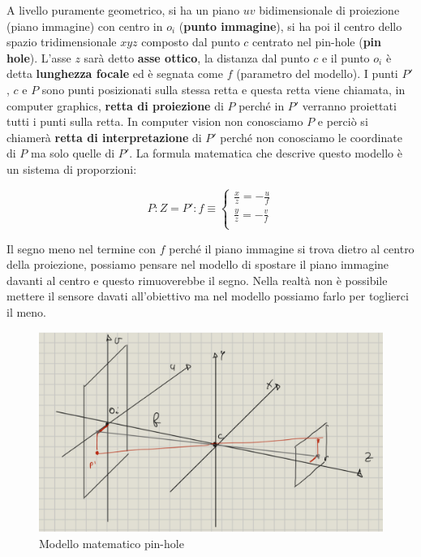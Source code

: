 A livello puramente geometrico, si ha un piano $uv$ bidimensionale di proiezione (piano immagine)
con centro in $o_i$ (\textbf{punto immagine}), si ha poi il centro dello spazio tridimensionale $xyz$ composto dal 
punto $c$ centrato nel pin-hole (\textbf{pin hole}). L'asse $z$ sarà detto \textbf{asse ottico}, la 
distanza dal punto $c$ e il punto $o_i$ è detta \textbf{lunghezza focale} ed è segnata 
come $f$ (parametro del modello). I punti $P'$, $c$ e $P$ sono punti posizionati sulla stessa retta e questa 
retta viene chiamata, in computer graphics, \textbf{retta di proiezione} di $P$ perché in $P'$ verranno 
proiettati tutti i punti sulla retta. In computer vision non conosciamo $P$ e perciò
si chiamerà \textbf{retta di interpretazione} di $P'$ perché non conosciamo le 
coordinate di $P$ ma solo quelle di $P'$. La formula matematica che descrive questo modello è un sistema di proporzioni:
 
$$P:Z = P':f \equiv \left\{\begin{array}{c}
    \frac{x}{z} = -\frac{u}{f}\\  
    \frac{y}{z} = -\frac{v}{f}\\  
\end{array}\right.$$

\begin{nota}
    Il segno meno nel termine con $f$ perché il piano immagine si trova dietro al 
    centro della proiezione, possiamo pensare nel modello di spostare il piano 
    immagine davanti al centro e questo rimuoverebbe il segno. Nella realtà non 
    è possibile mettere il sensore davati all'obiettivo ma nel modello possiamo 
    farlo per toglierci il meno.
\end{nota}

\begin{figure}
    \centering
    \includegraphics*[scale=0.2]{./figure/pin-hole-modello.jpg}
    \caption{Modello matematico pin-hole}
    \label{fig:pin_hole_model}
\end{figure}


